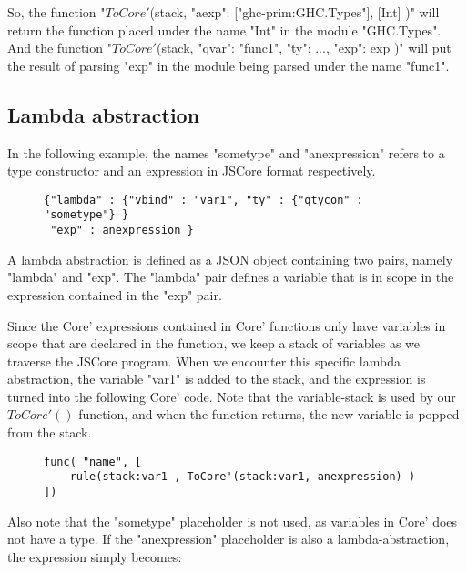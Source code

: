 So, the function "$ToCore'$(stack, {"aexp": ["ghc-prim:GHC.Types"], [Int]} )" will
return the function placed under the name "Int" in the module "GHC.Types". And 
the function "$ToCore'$(stack, {"qvar": "func1", "ty": ..., "exp": exp } )" will
put the result of parsing "exp" in the module being parsed under the name "func1".

\subsection{Lambda abstraction}

In the following example, the names "sometype" and "anexpression" refers to a 
type constructor and an expression in JSCore format respectively.

\begin{figure}[H]
\lstset{ %
language=Haskell,
caption=Python class implementing the Haskell Int Value.,
label=lst:int1
}
\begin{lstlisting}
{"lambda" : {"vbind" : "var1", "ty" : {"qtycon" : "sometype"} }
 "exp" : anexpression }
\end{lstlisting}
\end{figure}

A lambda abstraction is defined as a JSON object containing two pairs, namely 
"lambda" and "exp". The "lambda" pair defines a variable that is in scope in the
expression contained in the "exp" pair.

Since the Core' expressions contained in Core' functions only have variables in 
scope that are declared in the function, we keep a stack of variables as we traverse
the JSCore program. When we encounter this specific lambda abstraction, the variable
"var1" is added to the stack, and the expression is turned into the following Core' code. 
Note that the variable-stack is used by our $ToCore'()$ function, and when
the function returns, the new variable is popped from the stack.

\begin{figure}[H]
\lstset{ %
language=Haskell,
caption=Lambda abstraction in Core' format,
label=lst:int1
}
\begin{lstlisting}
func( "name", [
    rule(stack:var1 , ToCore'(stack:var1, anexpression) )
])
\end{lstlisting}
\end{figure}

Also note that the "sometype" placeholder is not used, as variables in Core' does
not have a type. If the "anexpression" placeholder is also a lambda-abstraction, the
expression simply becomes:

